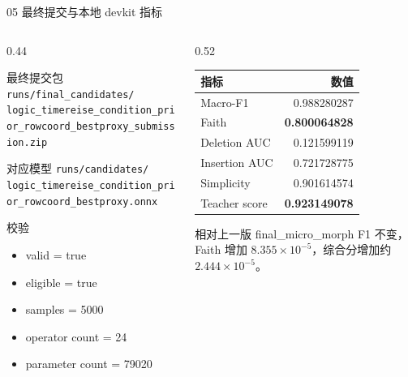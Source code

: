 \documentclass[aspectratio=169]{beamer}
\newcommand{\finalzip}{\texttt{runs/final\_candidates/}\\\texttt{logic\_timereise\_condition\_prior\_rowcoord\_bestproxy\_submission.zip}}
\newcommand{\finalonnx}{\texttt{runs/candidates/}\\\texttt{logic\_timereise\_condition\_prior\_rowcoord\_bestproxy.onnx}}
\newcommand{\tightitems}{\setlength{\itemsep}{0.32em}}
\begin{document}
\begin{frame}{05 最终提交与本地 devkit 指标}
    \begin{columns}[T,onlytextwidth]
        \begin{column}{0.44\textwidth}
            \begin{block}{最终提交包}
                \centering
                \scriptsize
                \finalzip
            \end{block}
            \begin{block}{对应模型}
                \centering
                \scriptsize
                \finalonnx
            \end{block}
            \begin{block}{校验}
                \begin{itemize}
                    \tightitems
                    \item valid = true
                    \item eligible = true
                    \item samples = 5000
                    \item operator count = 24
                    \item parameter count = 79020
                \end{itemize}
            \end{block}
        \end{column}
        \begin{column}{0.52\textwidth}
            \begin{table}
                \centering
                \small
                \begin{tabular}{lr}
                    \toprule
                    指标 & 数值 \\
                    \midrule
                    Macro-F1 & 0.988280287 \\
                    Faith & \textbf{0.800064828} \\
                    Deletion AUC & 0.121599119 \\
                    Insertion AUC & 0.721728775 \\
                    Simplicity & 0.901614574 \\
                    Teacher score & \textbf{0.923149078} \\
                    \bottomrule
                \end{tabular}
            \end{table}
            \begin{block}{相对上一版 final\_micro\_morph}
                F1 不变，Faith 增加 $8.355\times10^{-5}$，综合分增加约 $2.444\times10^{-5}$。
            \end{block}
        \end{column}
    \end{columns}
\end{frame}
\end{document}

